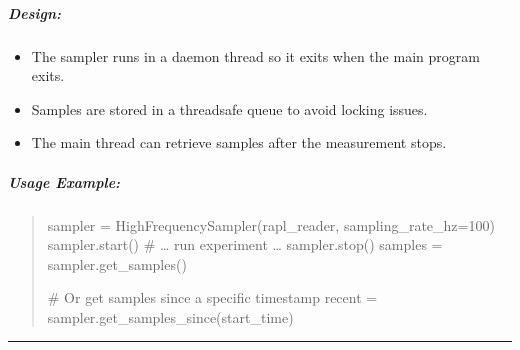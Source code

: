 \documentclass[letterpaper,10pt,english]{sphinxmanual}
\begin{document}
\subparagraph{Design:}
\label{\detokenize{core.utils.sampling:design}}\begin{itemize}
\item {} 
\sphinxAtStartPar
The sampler runs in a daemon thread so it exits when the main program exits.

\item {} 
\sphinxAtStartPar
Samples are stored in a thread\sphinxhyphen{}safe queue to avoid locking issues.

\item {} 
\sphinxAtStartPar
The main thread can retrieve samples after the measurement stops.

\end{itemize}


\subparagraph{Usage Example:}
\label{\detokenize{core.utils.sampling:usage-example}}\begin{quote}

\sphinxAtStartPar
sampler = HighFrequencySampler(rapl\_reader, sampling\_rate\_hz=100)
sampler.start()
\# … run experiment …
sampler.stop()
samples = sampler.get\_samples()

\sphinxAtStartPar
\# Or get samples since a specific timestamp
recent = sampler.get\_samples\_since(start\_time)
\end{quote}


\bigskip\hrule\bigskip

\end{document}
